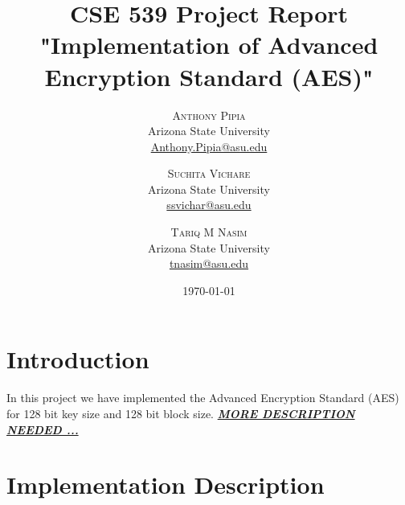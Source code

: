 \documentclass[twoside]{article}
\title{%
  CSE 539 Project Report \\
  \large "Implementation of Advanced Encryption Standard (AES)"} %
\author{%
\textsc{Anthony Pipia} \\[1ex] %
\normalsize Arizona State University \\ %
\normalsize \href{mailto:Anthony.Pipia@asu.edu}{Anthony.Pipia@asu.edu} %
\and
\textsc{Suchita Vichare} \\[1ex] %
\normalsize Arizona State University \\ %
\normalsize \href{mailto:ssvichar@asu.edu}{ssvichar@asu.edu} %
\and
\textsc{Tariq M Nasim} \\[1ex] %
\normalsize Arizona State University \\ %
\normalsize \href{mailto:tnasim@asu.edu}{tnasim@asu.edu} %
}
\date{\today} %
\begin{document}
\maketitle


\section{Introduction}

In this project we have implemented the Advanced Encryption Standard (AES) for 128 bit key size and 128 bit block size. \textbf{\textit{\underline{MORE DESCRIPTION NEEDED ... }}}


\section{Implementation Description}
\end{document}
